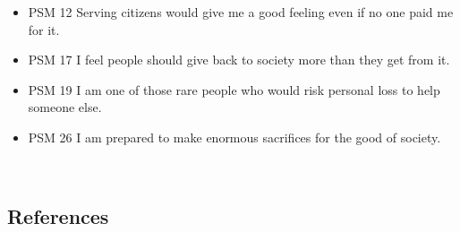 \documentclass[
  11pt,
  a4paper,
]{article}
\begin{document}
\begin{longtable}[]
\begin{minipage}[t]{\linewidth}
\begin{itemize}
\item
  PSM 12 Serving citizens would give me a good feeling even if no one
  paid me for it.
\item
  PSM 17 I feel people should give back to society more than they get
  from it.
\item
  PSM 19 I am one of those rare people who would risk personal loss to
  help someone else.
\item
  PSM 26 I am prepared to make enormous sacrifices for the good of
  society.
\end{itemize}
\end{minipage} \\
\end{longtable}

\newpage

\subsection*{References}\label{references}
\end{document}
